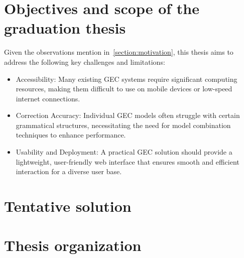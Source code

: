 \section{Objectives and scope of the graduation thesis}
\label{section:objective}
Given the observations mention in~\ref{section:motivation}, this thesis aims to address the following key challenges and limitations:

\begin{itemize}
  \item Accessibility: Many existing GEC systems require significant computing resources, making them difficult to use on mobile devices or low-speed internet connections.
  \item Correction Accuracy: Individual GEC models often struggle with certain grammatical structures, necessitating the need for model combination techniques to enhance performance.
  \item Usability and Deployment: A practical GEC solution should provide a lightweight, user-friendly web interface that ensures smooth and efficient interaction for a diverse user base.
\end{itemize}

\section{Tentative solution}
\label{section:solution}

\section{Thesis organization}
\label{section:organization}
